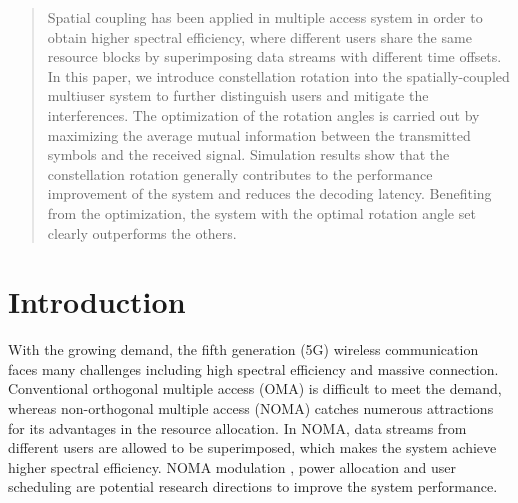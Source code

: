 \documentclass[conference]{IEEEtran}
\begin{document}




\maketitle

\begin{abstract}
Spatial coupling has been applied in multiple access system in order to obtain higher spectral efficiency, where different users share the same resource blocks by superimposing data streams with different time offsets. In this paper, we introduce constellation rotation into the spatially-coupled multiuser system to further distinguish users and mitigate the interferences. The optimization of the rotation angles is carried out by maximizing the average mutual information between the transmitted symbols and the received signal. Simulation results show that the constellation rotation generally contributes to the performance improvement of the system and reduces the decoding latency. Benefiting from the optimization, the system with the optimal rotation angle set clearly outperforms the others.
\end{abstract}





%
\IEEEpeerreviewmaketitle




\section{Introduction}

With the growing demand, the fifth generation (5G) wireless communication faces many challenges including high spectral efficiency and massive connection. Conventional orthogonal multiple access (OMA) is difficult to meet the demand, whereas non-orthogonal multiple access (NOMA) \cite{1} catches numerous attractions for its advantages in the resource allocation. In NOMA, data streams from different users are allowed to be superimposed, which makes the system achieve higher spectral efficiency. NOMA modulation \cite{2}, power allocation and user scheduling \cite{3} are potential research directions to improve the system performance.
\end{document}
